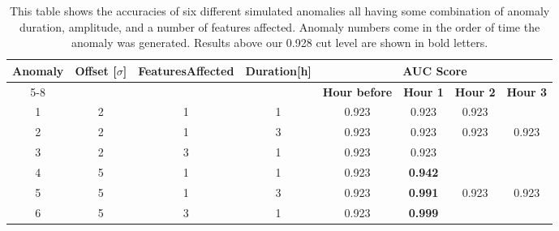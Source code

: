 \documentclass[5p]{elsarticle}
\begin{document}
\begin{table}[htbp]
\centering
\caption{This table shows the accuracies of six different simulated anomalies all having some combination of anomaly duration, amplitude, and a number of features affected. Anomaly numbers come in the order of time the anomaly was generated. Results above our 0.928 cut level are shown in bold letters.}
\label{table:nntonfixed}
\resizebox{\linewidth}{!} {%
\begin{tabular}{@{}cccccccc@{}}
\toprule
\multirow{2}{*}{\textbf{Anomaly}} & \multirow{2}{*}{\textbf{Offset {[}$\sigma${]}}} & \multirow{2}{*}{\textbf{Features\newline Affected}} & \multirow{2}{*}{\textbf{Duration{[}h{]}}} & \multicolumn{4}{c}{\textbf{AUC Score}}                                     \\ \cmidrule(l){5-8} 
                                  &                                                 &                                             &                                           & \textbf{Hour before} & \textbf{Hour 1} & \textbf{Hour 2} & \textbf{Hour 3} \\ \midrule
1                                 & 2                                               & 1                                           & 1                                         & 0.923                & 0.923  &     0.923            &                 \\
2                                 & 2                                               & 1                                           & 3                                         & 0.923                & 0.923  & 0.923  & 0.923           \\
3                                 & 2                                               & 3                                           & 1                                         & 0.923                & 0.923  &                 &                 \\
4                                 & 5                                               & 1                                           & 1                                         & 0.923                & \textbf{0.942}  &                 &                 \\
5                                 & 5                                               & 1                                           & 3                                         & 0.923                & \textbf{0.991}  & 0.923  & 0.923           \\
6                                 & 5                                               & 3                                           & 1                                         & 0.923                & \textbf{0.999}  &                 &                 \\ 
\bottomrule
\end{tabular}%
}
\end{table}
\end{document}
